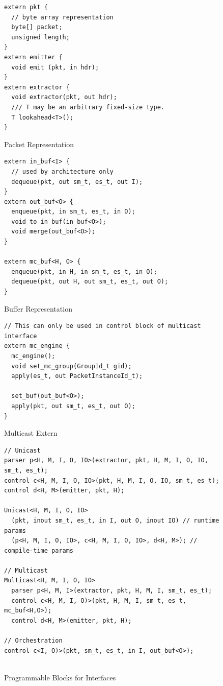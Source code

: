 \begin{figure}[ht]
\begin{lstlisting}[frame=none]
extern pkt {
  // byte array representation
  byte[] packet;
  unsigned length;
}
extern emitter {
  void emit (pkt, in hdr);
}
extern extractor {
  void extractor(pkt, out hdr);
  /// T may be an arbitrary fixed-size type.
  T lookahead<T>();
}
\end{lstlisting}
\caption{Packet Representation}
\label{fig:pkt-externs}
\end{figure}
\begin{figure}[ht]
\begin{lstlisting}[frame=none]
extern in_buf<I> {
  // used by architecture only
  dequeue(pkt, out sm_t, es_t, out I);
}
extern out_buf<O> {
  enqueue(pkt, in sm_t, es_t, in O);
  void to_in_buf(in_buf<O>);
  void merge(out_buf<O>);
}

extern mc_buf<H, O> {
  enqueue(pkt, in H, in sm_t, es_t, in O);
  dequeue(pkt, out H, out sm_t, es_t, out O);
}
\end{lstlisting}
\caption{Buffer Representation}
\label{fig:pkt-buf}
\end{figure}
\begin{figure}[ht]
\begin{lstlisting}[frame=none]
// This can only be used in control block of multicast interface
extern mc_engine {
  mc_engine();
  void set_mc_group(GroupId_t gid);
  apply(es_t, out PacketInstanceId_t);
  
  set_buf(out_buf<O>);
  apply(pkt, out sm_t, es_t, out O);  
}
\end{lstlisting}
\caption{Multicast Extern}
\label{fig:msa-multicast-extern}
\end{figure}
\begin{figure}[H]
\begin{lstlisting}[frame=none]
// Unicast
parser p<H, M, I, O, IO>(extractor, pkt, H, M, I, O, IO, sm_t, es_t);
control c<H, M, I, O, IO>(pkt, H, M, I, O, IO, sm_t, es_t);
control d<H, M>(emitter, pkt, H);

Unicast<H, M, I, O, IO>
  (pkt, inout sm_t, es_t, in I, out O, inout IO) // runtime params
  (p<H, M, I, O, IO>, c<H, M, I, O, IO>, d<H, M>); // compile-time params

// Multicast
Multicast<H, M, I, O, IO> 
  parser p<H, M, I>(extractor, pkt, H, M, I, sm_t, es_t);
  control c<H, M, I, O)>(pkt, H, M, I, sm_t, es_t, mc_buf<H,O>);
  control d<H, M>(emitter, pkt, H);

// Orchestration
control c<I, O)>(pkt, sm_t, es_t, in I, out_buf<O>);
    
\end{lstlisting}
\caption{Programmable Blocks for Interfaces}
\label{fig:programmable-blocks-for-interfaces}
\end{figure}

